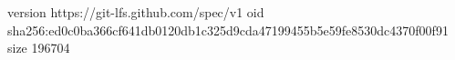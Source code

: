 version https://git-lfs.github.com/spec/v1
oid sha256:ed0c0ba366cf641db0120db1c325d9cda47199455b5e59fe8530dc4370f00f91
size 196704
